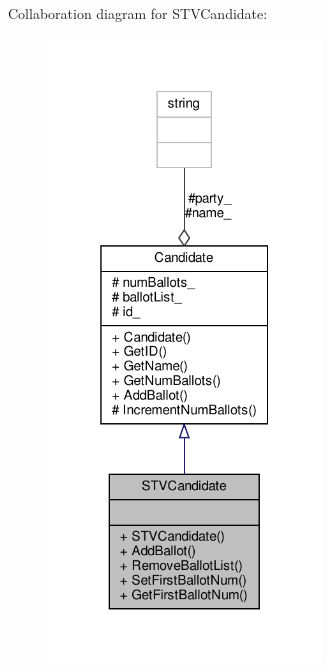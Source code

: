Collaboration diagram for S\+T\+V\+Candidate\+:\nopagebreak
\begin{figure}[H]
\begin{center}
\leavevmode
\includegraphics[width=205pt]{classSTVCandidate__coll__graph}
\end{center}
\end{figure}
